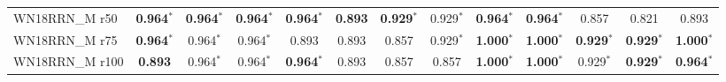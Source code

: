 \begin{table}[t]
{\begin{tabular}{l||cccccc||cccccc}
WN18RRN\_M r50 & \textbf{0.964}$^*$ & \textbf{0.964}$^*$ & \textbf{0.964}$^*$ & \textbf{0.964}$^*$ & \textbf{0.893} & \textbf{0.929}$^*$ & 0.929$^*$ & \textbf{0.964}$^*$ & \textbf{0.964}$^*$ & 0.857 & 0.821 & 0.893 \\
WN18RRN\_M r75 & \textbf{0.964}$^*$ & 0.964$^*$ & 0.964$^*$ & 0.893 & 0.893 & 0.857 & 0.929$^*$ & \textbf{1.000}$^*$ & \textbf{1.000}$^*$ & \textbf{0.929}$^*$ & \textbf{0.929}$^*$ & \textbf{1.000}$^*$ \\
WN18RRN\_M r100 & \textbf{0.893} & 0.964$^*$ & 0.964$^*$ & \textbf{0.964}$^*$ & 0.893 & 0.857 & 0.857 & \textbf{1.000}$^*$ & \textbf{1.000}$^*$ & 0.929$^*$ & \textbf{0.929}$^*$ & \textbf{0.964}$^*$ \\
\hline
\end{tabular}%
}
\end{table}
